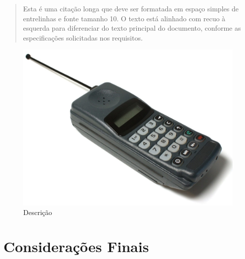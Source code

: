 \documentclass{wticifes}
\begin{document}
\begin{quote}
Esta é uma citação longa que deve ser formatada em espaço simples de entrelinhas e fonte tamanho 10. O texto está alinhado com recuo à esquerda para diferenciar do texto principal do documento, conforme as especificações solicitadas nos requisitos.
\end{quote}

\lipsum[3]

\begin{figure}
    \centering
    \includegraphics[width=0.5\linewidth]{img/img.jpg}
    \caption{Descrição}
    \label{fig:enter-label}
\end{figure}

\section{Considerações Finais}
\lipsum[2]

\end{document}
